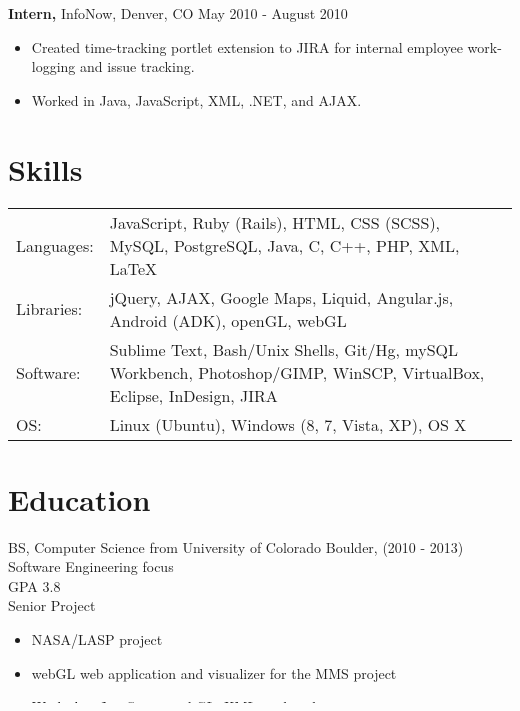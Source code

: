 \documentclass[margin]{res}
\begin{document}
\begin{resume}
 {\bf Intern,} InfoNow, Denver, CO  \hfill May 2010 - August 2010
 \begin{itemize} \itemsep -2pt  %
 \item Created time-tracking portlet extension to JIRA for internal employee work-logging and issue tracking.
 \item Worked in Java, JavaScript, XML, .NET, and AJAX. 
 \end{itemize}

\section{Skills}
   \begin{tabular}{l p{4.25in}}
    {Languages:} & JavaScript, Ruby (Rails), HTML, CSS (SCSS), MySQL, PostgreSQL, Java, C, C++, PHP, XML, LaTeX \\ [0.5ex]
    {Libraries:} & jQuery, AJAX, Google Maps, Liquid, Angular.js, Android (ADK), openGL, webGL \\ [0.5ex]
    {Software:} & Sublime Text, Bash/Unix Shells, Git/Hg, mySQL Workbench, Photoshop/GIMP, WinSCP, VirtualBox, Eclipse, InDesign, JIRA \\ [0.5ex]
    {OS:} & Linux (Ubuntu), Windows (8, 7, Vista, XP), OS X \\ [0.5ex]
 \end{tabular}

\section{Education} 
  BS, Computer Science from University of Colorado Boulder, (2010 - 2013)\\
  Software Engineering focus \\
  GPA 3.8 \\
  Senior Project
  \begin{itemize} \itemsep -2pt  %
  \item NASA/LASP project
  \item webGL web application and visualizer for the MMS project
  \item Worked in JavaScript, webGL, XML, and python
  \end{itemize}  

\section{Awards}
  \begin{itemize} \itemsep -12pt \setlength{\itemindent}{-15pt}
  \item CU Dean’s List (2010-2013) \\
  \item Miami University Dean’s List (2009-2010) \\
  \item CU Mobile App Challenge 3rd Place (2013) \\
  \item Tau Beta Pi Engineering Honor Society Member and Officer (2010-2013) \\
  \end{itemize}

\end{resume} 
\end{document}
